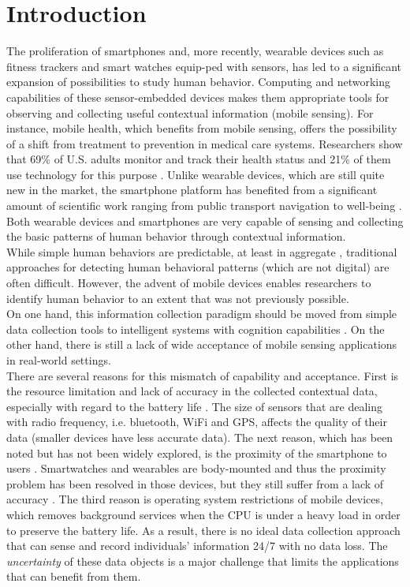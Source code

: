 \documentclass{sig-alternate}
\begin{document}
\section{Introduction}
\setlength{\textfloatsep}{8pt plus 1.0pt minus 1.0pt}
\setlength{}
The proliferation of smartphones and, more recently, wearable devices such as fitness trackers and smart watches equip-ped with sensors, has led to a significant expansion of possibilities to study human behavior. Computing and networking capabilities of these sensor-embedded devices makes them appropriate tools for observing and collecting useful contextual information (mobile sensing). For instance, mobile health, which benefits from mobile sensing, offers the possibility of a shift from treatment to prevention in medical care systems. Researchers show that 69\% of U.S. adults monitor and track their health status and 21\% of them use technology for this purpose \cite{tracking4health}. Unlike wearable devices, which are still quite new in the market, the smartphone platform has benefited from a significant amount of scientific work ranging from public transport navigation \cite{micronav} to well-being \cite{bewell}. Both wearable devices and smartphones are very capable of sensing and collecting the basic patterns of human behavior through contextual information.\\
While simple human behaviors are predictable, at least in aggregate \cite{bursts}, traditional approaches for detecting human behavioral patterns (which are not digital)  are often difficult. However, the advent of mobile devices enables researchers to identify human behavior to an extent that was not previously possible. \\
On one hand, this information collection paradigm should be moved from simple data collection tools to intelligent systems with cognition capabilities \cite{smart2cogphone}. On the other hand, there is still a lack of wide acceptance of mobile sensing applications in real-world settings. \\
There are several reasons for this mismatch of capability and acceptance. First is the resource limitation and lack of accuracy in the collected contextual data, especially with regard to the battery life \cite{funchmobcom}. The size of sensors that are dealing with radio frequency, i.e. bluetooth, WiFi and GPS, affects the quality of their data \cite{cacm} (smaller devices have less accurate data). The next reason, which has been noted but has not been widely explored, is the proximity of the smartphone to users \cite{gettingcloser}. Smartwatches and wearables are body-mounted and thus the proximity problem has been resolved in those devices, but they still suffer from a lack of accuracy \cite{validity}. The third reason is operating system restrictions of mobile devices, which removes background services when the CPU is under a heavy load in order to preserve the battery life. As a result, there is no ideal data collection approach that can sense and record individuals' information 24/7 with no data loss. The \emph{uncertainty} of these data objects is a major challenge that limits the applications that can benefit from them.\\
\end{document}
